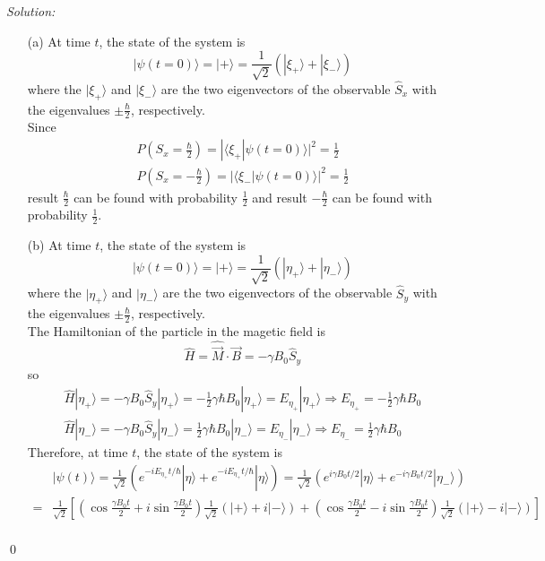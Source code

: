 \documentclass[12pt,a4paper]{article}
\newenvironment{sol}
    {\emph{Solution:}
    }
    {
    \qed
    }
\begin{document}
\begin{sol}
\begin{itemize}
\item[(a)] At time $t$, the state of the system is
\begin{equation}
|\psi(t=0)\rangle=|+\rangle=\frac{1}{\sqrt{2}}(|\xi_+\rangle+|\xi_-\rangle)
\end{equation}
where the $|\xi_+\rangle$ and $|\xi_-\rangle$ are the two eigenvectors of the observable $\hat{S}_x$ with the eigenvalues $\pm\frac{\hbar}{2}$, respectively.\\
Since
\begin{gather}
P(S_x=\frac{\hbar}{2})=|\langle\xi_+|\psi(t=0)\rangle|^2=\frac{1}{2}\\
P(S_x=-\frac{\hbar}{2})=|\langle\xi_-|\psi(t=0)\rangle|^2=\frac{1}{2}
\end{gather}
result $\frac{\hbar}{2}$ can be found with probability $\frac{1}{2}$ and result $-\frac{\hbar}{2}$ can be found with probability $\frac{1}{2}$.
\item[(b)] At time $t$, the state of the system is
\begin{equation}
|\psi(t=0)\rangle=|+\rangle=\frac{1}{\sqrt{2}}(|\eta_+\rangle+|\eta_-\rangle)
\end{equation}
where the $|\eta_+\rangle$ and $|\eta_-\rangle$ are the two eigenvectors of the observable $\hat{S}_y$ with the eigenvalues $\pm\frac{\hbar}{2}$, respectively.\\
The Hamiltonian of the particle in the magetic field is
\begin{equation}
\hat{H}=\hat{\vec{M}}\cdot\vec{B}=-\gamma B_0\hat{S}_y
\end{equation}
so
\begin{gather}
\hat{H}|\eta_+\rangle=-\gamma B_0\hat{S}_y|\eta_+\rangle=-\frac{1}{2}\gamma\hbar B_0|\eta_+\rangle=E_{\eta_+}|\eta_+\rangle\Longrightarrow E_{\eta_+}=-\frac{1}{2}\gamma\hbar B_0\\
\hat{H}|\eta_-\rangle=-\gamma B_0\hat{S}_y|\eta_-\rangle=\frac{1}{2}\gamma\hbar B_0|\eta_-\rangle=E_{\eta_-}|\eta_-\rangle\Longrightarrow E_{\eta_-}=\frac{1}{2}\gamma\hbar B_0
\end{gather}
Therefore, at time $t$, the state of the system is
\small\begin{align}
\nonumber&|\psi(t)\rangle=\frac{1}{\sqrt{2}}(e^{-iE_{\eta_+}t/\hbar}|\eta\rangle+e^{-iE_{\eta_+}t/\hbar}|\eta\rangle)=\frac{1}{\sqrt{2}}(e^{i\gamma B_0t/2}|\eta\rangle+e^{-i\gamma B_0t/2}|\eta_-\rangle)\\
\nonumber=&\frac{1}{\sqrt{2}}[(\cos\frac{\gamma B_0t}{2}+i\sin\frac{\gamma B_0t}{2})\frac{1}{\sqrt{2}}(|+\rangle+i|-\rangle)+(\cos\frac{\gamma B_0t}{2}-i\sin\frac{\gamma B_0t}{2})\frac{1}{\sqrt{2}}(|+\rangle-i|-\rangle)]\\

\end{align}
\end{itemize}
\end{sol}
\end{document}
